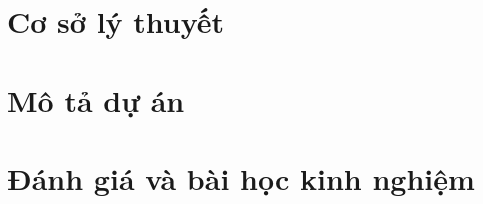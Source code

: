 \documentclass[12pt,a4paper]{report}
\begin{document}


\chapter{Cơ sở lý thuyết}



\chapter{Mô tả dự án}




\chapter{Đánh giá và bài học kinh nghiệm}


\end{document}
